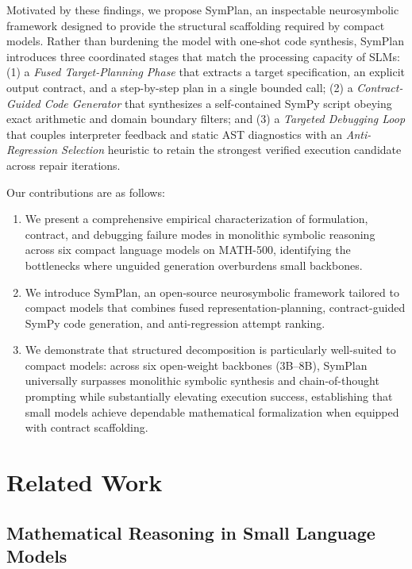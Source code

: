 \documentclass[runningheads]{llncs}
\begin{document}
Motivated by these findings, we propose SymPlan, an inspectable neurosymbolic framework designed to provide the structural scaffolding required by compact models. Rather than burdening the model with one-shot code synthesis, SymPlan introduces three coordinated stages that match the processing capacity of SLMs: (1) a \textit{Fused Target-Planning Phase} that extracts a target specification, an explicit output contract, and a step-by-step plan in a single bounded call; (2) a \textit{Contract-Guided Code Generator} that synthesizes a self-contained SymPy script obeying exact arithmetic and domain boundary filters; and (3) a \textit{Targeted Debugging Loop} that couples interpreter feedback and static AST diagnostics with an \textit{Anti-Regression Selection} heuristic to retain the strongest verified execution candidate across repair iterations.

Our contributions are as follows:
\begin{enumerate}
    \item We present a comprehensive empirical characterization of formulation, contract, and debugging failure modes in monolithic symbolic reasoning across six compact language models on MATH-500, identifying the bottlenecks where unguided generation overburdens small backbones.
    \item We introduce SymPlan, an open-source neurosymbolic framework tailored to compact models that combines fused representation-planning, contract-guided SymPy code generation, and anti-regression attempt ranking.
    \item We demonstrate that structured decomposition is particularly well-suited to compact models: across six open-weight backbones (3B--8B), SymPlan universally surpasses monolithic symbolic synthesis and chain-of-thought prompting while substantially elevating execution success, establishing that small models achieve dependable mathematical formalization when equipped with contract scaffolding.
\end{enumerate}

\section{Related Work}

\subsection{Mathematical Reasoning in Small Language Models}
\end{document}
